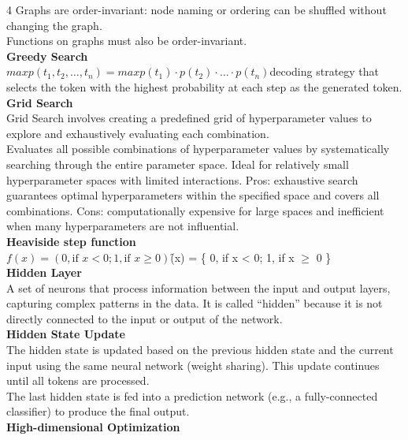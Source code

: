 \documentclass[8pt]{extarticle}
\begin{document}
\begin{multicols}{4}
Graphs are order-invariant: node naming or ordering can be shuffled without changing the graph.\\
Functions on graphs must also be order-invariant.\\
\vspace{2pt}\textbf{Greedy Search}\\
$maxp(t_1, t_2, \dots, t_n) = maxp(t_1) \cdot p(t_2) \cdot \dots \cdot p(t_n)$\A decoding strategy that selects the token with the highest probability at each step as the generated token.\\
\vspace{2pt}\textbf{Grid Search}\\
Grid Search involves creating a predefined grid of hyperparameter values to explore and exhaustively evaluating each combination.\\
Evaluates all possible combinations of hyperparameter values by systematically searching through the entire parameter space. Ideal for relatively small hyperparameter spaces with limited interactions. Pros: exhaustive search guarantees optimal hyperparameters within the specified space and covers all combinations. Cons: computationally expensive for large spaces and inefficient when many hyperparameters are not influential.\\
\vspace{2pt}\textbf{Heaviside step function}\\
$f(x) = (0, \text{if } x < 0; 1, \text{if } x \ge 0)$\f(x) = \{ 0, if x < 0; 1, if x $\geq$ 0 \}\\
\vspace{2pt}\textbf{Hidden Layer}\\
A set of neurons that process information between the input and output layers, capturing complex patterns in the data. It is called ``hidden'' because it is not directly connected to the input or output of the network.\\
\vspace{2pt}\textbf{Hidden State Update}\\
The hidden state is updated based on the previous hidden state and the current input using the same neural network (weight sharing). This update continues until all tokens are processed.\\
The last hidden state is fed into a prediction network (e.g., a fully-connected classifier) to produce the final output.\\
\vspace{2pt}\textbf{High-dimensional Optimization}\\

\end{multicols}
\end{document}
